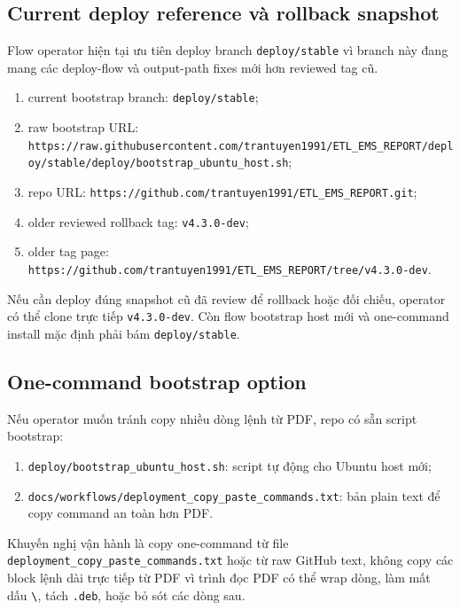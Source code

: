 \subsection{Current deploy reference và rollback snapshot}

Flow operator hiện tại ưu tiên deploy branch \texttt{deploy/stable} vì branch này đang mang các deploy-flow và output-path fixes mới hơn reviewed tag cũ.

\begin{enumerate}[label=-]
\item current bootstrap branch: \texttt{deploy/stable};
\item raw bootstrap URL: \nolinkurl{https://raw.githubusercontent.com/trantuyen1991/ETL_EMS_REPORT/deploy/stable/deploy/bootstrap_ubuntu_host.sh};
\item repo URL: \nolinkurl{https://github.com/trantuyen1991/ETL_EMS_REPORT.git};
\item older reviewed rollback tag: \texttt{v4.3.0-dev};
\item older tag page: \nolinkurl{https://github.com/trantuyen1991/ETL_EMS_REPORT/tree/v4.3.0-dev}.
\end{enumerate}

Nếu cần deploy đúng snapshot cũ đã review để rollback hoặc đối chiếu, operator có thể clone trực tiếp \texttt{v4.3.0-dev}. Còn flow bootstrap host mới và one-command install mặc định phải bám \texttt{deploy/stable}.

\subsection{One-command bootstrap option}

Nếu operator muốn tránh copy nhiều dòng lệnh từ PDF, repo có sẵn script bootstrap:

\begin{enumerate}[label=-]
\item \texttt{deploy/bootstrap\_ubuntu\_host.sh}: script tự động cho Ubuntu host mới;
\item \texttt{docs/workflows/deployment\_copy\_paste\_commands.txt}: bản plain text để copy command an toàn hơn PDF.
\end{enumerate}

Khuyến nghị vận hành là copy one-command từ file \texttt{deployment\_copy\_paste\_commands.txt} hoặc từ raw GitHub text, không copy các block lệnh dài trực tiếp từ PDF vì trình đọc PDF có thể wrap dòng, làm mất dấu \texttt{\textbackslash}, tách \texttt{.deb}, hoặc bỏ sót các dòng sau.

